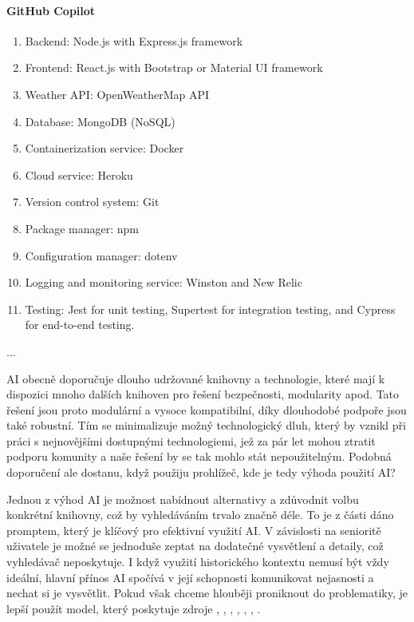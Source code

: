 \documentclass[FM,DP]{tulthesis}
\begin{document}
\begin{tcolorbox}[colback=white,colframe=black]
			\vspace{0.6em}
			
			
			\paragraph{GitHub Copilot}
			\begin{enumerate}
				\item Backend: Node.js with Express.js framework
				\item Frontend: React.js with Bootstrap or Material UI framework
				\item Weather API: OpenWeatherMap API
				\item Database: MongoDB (NoSQL)
				\item Containerization service: Docker
				\item Cloud service: Heroku
				\item Version control system: Git
				\item Package manager: npm
				\item Configuration manager: dotenv
				\item Logging and monitoring service: Winston and New Relic
				\item Testing: Jest for unit testing, Supertest for integration testing, and Cypress for end-to-end testing.
			\end{enumerate}
			... \cite{gitCopilot_navrh}
		\end{tcolorbox}
		\vspace{0.6em}
		
		AI obecně doporučuje dlouho udržované knihovny a technologie, které mají k dispozici mnoho dalších knihoven pro řešení bezpečnosti, modularity apod. Tato řešení jsou proto modulární a vysoce kompatibilní, díky dlouhodobé podpoře jsou také robustní. Tím se minimalizuje možný technologický dluh, který by vznikl při práci s nejnovějšími dostupnými technologiemi, jež za pár let mohou ztratit podporu komunity a naše řešení by se tak mohlo stát nepoužitelným. Podobná doporučení ale dostanu, když použiju prohlížeč, kde je tedy výhoda použití AI?
		
		Jednou z výhod AI je možnost nabídnout alternativy a zdůvodnit volbu konkrétní knihovny, což by vyhledáváním trvalo značně déle. To je z části dáno promptem, který je klíčový pro efektivní využití AI. V závislosti na senioritě uživatele je možné se jednoduše zeptat na dodatečné vysvětlení a detaily, což vyhledávač neposkytuje. I když využití historického kontextu nemusí být vždy ideální, hlavní přínos AI spočívá v její schopnosti komunikovat nejasnosti a nechat si je vysvětlit. Pokud však chceme hlouběji proniknout do problematiky, je lepší použít model, který poskytuje zdroje \cite{claude_navrh}, \cite{chatgpt_navrh}, \cite{bard_navrh}, \cite{codellama_navrh}, \cite{falcon_navrh}, \cite{gitCopilot_navrh}, \cite{bingCopilot_navrh} \cite{perplexity}. 
		
\end{document}
